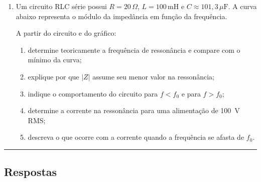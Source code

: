 \documentclass[12pt,a4paper]{article}
\newcommand{\gabarito}{\vspace{0.6em}\hrule\vspace{0.5em}\subsection*{Respostas}\vspace{-0.3em}}
\begin{document}
\begin{enumerate}[label=\textbf{2.\arabic*.}]
\item Um circuito RLC série possui $R=20\,\Omega$, $L=100\,\mathrm{mH}$ e $C\approx101{,}3\,\mu\mathrm{F}$. A curva abaixo representa o módulo da impedância em função da frequência.

\begin{center}
\end{center}

A partir do circuito e do gráfico:
\begin{enumerate}[label=\alph*)]
    \item determine teoricamente a frequência de ressonância e compare com o mínimo da curva;
    \item explique por que $|Z|$ assume seu menor valor na ressonância;
    \item indique o comportamento do circuito para $f<f_0$ e para $f>f_0$;
    \item determine a corrente na ressonância para uma alimentação de \SI{100}{V} RMS;
    \item descreva o que ocorre com a corrente quando a frequência se afasta de $f_0$.
\end{enumerate}

\end{enumerate}

\gabarito
\end{document}
